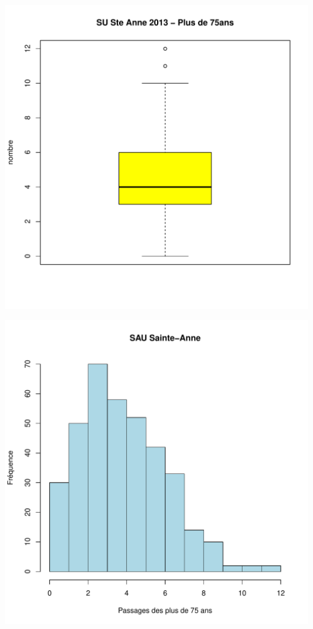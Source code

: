 \documentclass[12pt,english,french,twoside]{book}\usepackage[]{graphicx}\usepackage[]{color}
\makeatletter
\def\maxwidth{ %
  \ifdim\Gin@nat@width>\linewidth
    \linewidth
  \else
    \Gin@nat@width
  \fi
}
\makeatother
\begin{document}
\includegraphics[width=\maxwidth]{figure/stAnne_sup75_passages-1} 

\includegraphics[width=\maxwidth]{figure/stAnne_sup75_passages-2} 
\end{document}
